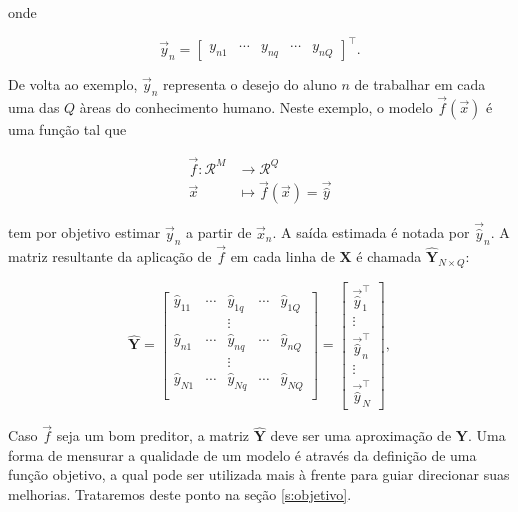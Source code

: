     onde

    \begin{equation} \label{e:y_n}
      \vec{y}_n = \begin{bmatrix} y_{n1} & \cdots & y_{nq} & \cdots & y_{nQ} \end{bmatrix}^{\top}
      .
    \end{equation}

    De volta ao exemplo, $\vec{y}_n$ representa o desejo do aluno $n$ de trabalhar em cada uma das $Q$ àreas do conhecimento humano. Neste exemplo, o modelo $\vec{f}(\vec{x})$ é uma função tal que

    \begin{align*}
      \vec{f} \colon \mathcal{R}^M & \longrightarrow \mathcal{R}^Q \\
      \vec{x} & \longmapsto \vec{f}({\vec{x}}) = \vec{\hat{y}}
    \end{align*}

    \noindent tem por objetivo estimar $\vec{y}_n$ a partir de $\vec{x}_n$. A saída estimada é notada por $\vec{\hat{y}}_n$. A matriz resultante da aplicação de $\vec{f}$ em cada linha de $\boldsymbol{X}$ é chamada $\boldsymbol{\hat{Y}}_{N \times Q}$:

    \begin{equation} \label{e:Y_hat}
      \boldsymbol{\hat{Y}} = \begin{bmatrix}
            \hat{y}_{11} & \cdots & \hat{y}_{1q} & \cdots & \hat{y}_{1Q} \\
                   & & \vdots & &       \\
            \hat{y}_{n1} & \cdots & \hat{y}_{nq} & \cdots & \hat{y}_{nQ} \\
                   & & \vdots & &       \\
            \hat{y}_{N1} & \cdots & \hat{y}_{Nq} & \cdots & \hat{y}_{NQ} \\
          \end{bmatrix}
        = \begin{bmatrix}
            \vec{\hat{y}}_1^{\top} \\
            \vdots \\
            \vec{\hat{y}}_n^{\top} \\
            \vdots \\
            \vec{\hat{y}}_N^{\top}
          \end{bmatrix}
          ,
    \end{equation}

    Caso $\vec{f}$ seja um bom preditor, a matriz $\boldsymbol{\hat{Y}}$ deve ser uma aproximação de $\boldsymbol{Y}$. Uma forma de mensurar a qualidade de um modelo é através da definição de uma função objetivo, a qual pode ser utilizada mais à frente para guiar direcionar suas melhorias. Trataremos deste ponto na seção \ref{s:objetivo}.

